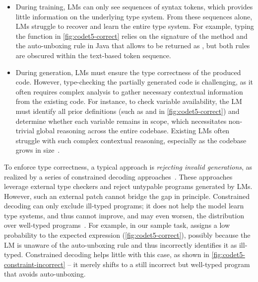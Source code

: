 \begin{itemize}
    \item During training, LMs can only see sequences of syntax tokens, which provides little information on the underlying type system. From these sequences alone, LMs struggle to recover and learn the entire type system.
    For example, typing the function in \autoref{fig:codet5-correct} relies on the signature of the  method and the auto-unboxing rule in Java that allows  to be returned as , but both rules are obscured within the text-based token sequence.
    
    \item During generation, LMs must ensure the type correctness of the produced code. However, type-checking the partially generated code is challenging, as it often requires complex analysis to gather necessary contextual information from the existing code. 
    For instance, to check variable availability, the LM must identify all prior definitions (such as  and  in \autoref{fig:codet5-correct}) and determine whether each variable remains in scope, which necessitates non-trivial global reasoning across the entire codebase. Existing LMs often struggle with such complex contextual reasoning, especially as the codebase grows in size~\cite{guo_2025,DBLP:conf/acl/BaiTZ0WLCX0D0L25}.
\end{itemize}

To enforce type correctness, a typical approach is \emph{rejecting invalid generations}, as realized by a series of {constrained decoding} approaches~\cite{DBLP:conf/sigsoft/0003X023,DBLP:journals/corr/abs-2504-09246}.
These approaches leverage external type checkers and reject untypable programs generated by LMs.
%
However, such an external patch cannot bridge the gap in principle.
%
Constrained decoding can only exclude ill-typed programs; it does not help the model learn type systems, and thus cannot improve, and may even worsen, the distribution over well-typed programs~\cite{DBLP:conf/nips/ParkWBPD24}.
%
For example, in our sample task,  assigns a low probability to the expected expression (\autoref{fig:codet5-correct}), possibly because the LM is unaware of the auto-unboxing rule and thus incorrectly identifies it as ill-typed.
%
Constrained decoding helps little with this case, as shown in \autoref{fig:codet5-constraint-incorrect} -- it merely shifts to a still incorrect but well-typed program that avoids auto-unboxing.

